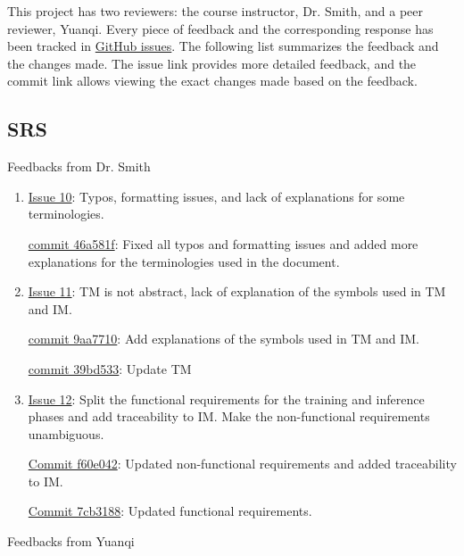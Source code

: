 \documentclass{article}
\begin{document}

This project has two reviewers: the course instructor, Dr. Smith, and a peer reviewer, Yuanqi. Every piece of feedback and the corresponding response has been tracked in \href{https://github.com/V-AS/Two-tower-recommender-system/issues}{GitHub issues}. The following list summarizes the feedback and the changes made. The issue link provides more detailed feedback, and the commit link allows viewing the exact changes made based on the feedback.

\subsection{SRS}
Feedbacks from Dr. Smith
\begin{enumerate}
    \item \href{https://github.com/V-AS/Two-tower-recommender-system/issues/10}{Issue 10}: Typos, formatting issues, and lack of explanations for some terminologies.  
    
    \href{https://github.com/V-AS/Two-tower-recommender-system/commit/46a581ffec8f09107f233065023d5e09764f8eb1}{commit 46a581f}: Fixed all typos and formatting issues and added more explanations for the terminologies used in the document. 
    
    \item \href{https://github.com/V-AS/Two-tower-recommender-system/issues/11}{Issue 11}: TM is not abstract, lack of explanation of the symbols used in TM and IM.
    
    \href{https://github.com/V-AS/Two-tower-recommender-system/commit/9aa7710e560448bddbc17a60377ccdd5e0e5989a}{commit 9aa7710}: Add explanations of the symbols used in TM and IM.

    \href{https://github.com/V-AS/Two-tower-recommender-system/commit/39bd533753ef0951fa4a5d411c8ae693e7f99ee7}{commit 39bd533}: Update TM 

    \item \href{https://github.com/V-AS/Two-tower-recommender-system/issues/12}{Issue 12}: Split the functional requirements for the training and inference phases and add traceability to IM.  
    Make the non-functional requirements unambiguous.  

    \href{https://github.com/V-AS/Two-tower-recommender-system/commit/f60e04293c87e0ce356bcfcb75288305ada5343f}{Commit f60e042}: Updated non-functional requirements and added traceability to IM.  

    \href{https://github.com/V-AS/Two-tower-recommender-system/commit/7cb31888f47dff465fedaf962dd89f10d9546b52}{Commit 7cb3188}: Updated functional requirements.  

\end{enumerate}
Feedbacks from Yuanqi
\end{document}
